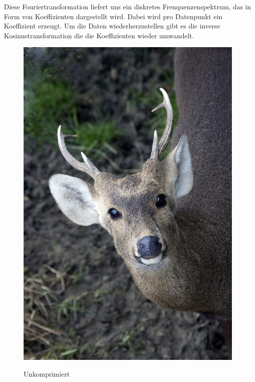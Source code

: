         \noindent
        Diese Fouriertransformation liefert uns ein diskretes Frenquenzenspektrum, das in Form von Koeffizienten dargestellt wird. Dabei wird pro Datenpunkt ein Koeffizient erzeugt. Um die Daten wiederherzustellen gibt es die inverse Kosinustransformation die die Koeffizienten wieder umwandelt.

        \begin{multicols}{2}
            \begin{figure}[H]
                \begin{center}
                    \includegraphics[scale=1]{../pictures/gazelle-uncompressed.jpg}\\
                    \caption{Unkomprimiert}\label{fig:gazelle-uncompressed}
                \end{center}
            \end{figure}
            \par
            \begin{figure}[H]
                \begin{center}

\end{center}
\end{figure}
\end{multicols}
